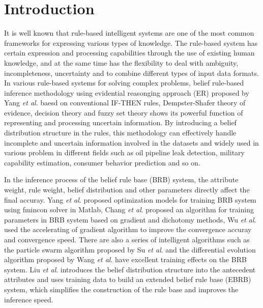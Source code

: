 \documentclass{ieeeaccess}
\begin{document}
\section{Introduction}
\label{sec:introduction}

It is well known that rule-based intelligent systems are one of the most common frameworks for expressing various types of knowledge.
The rule-based system has certain expression and processing capabilities through the use of existing human knowledge,
and at the same time has the flexibility to deal with ambiguity, incompleteness, uncertainty and to combine different types of input data formats.
In various rule-based systems for solving complex problems, belief rule-based inference methodology using evidential reasonging approach (ER) proposed by Yang \textit{et al}.\cite{a1}
baesd on conventional IF-THEN rules\cite{a2}, Dempster-Shafer theory of evidence\cite{a3,a4}, decision theory\cite{a5}
and fuzzy set theory\cite{a6} shows its powerful function of representing and processing uncertain information.
By introducing a belief distribution structure in the rules, this methodology can
effectively handle incomplete and uncertain information involved in the datasets and widely used in various problem in
different fields such as oil pipeline leak detection\cite{a7}, military capability estimation\cite{a8}, consumer behavior
prediction\cite{a9} and so on.

In the inference process of the belief rule base (BRB) system, the attribute weight, rule weight, belief distribution and other parameters
directly affect the final accuray. Yang \textit{et al}.\cite{a10} proposed optimization models for training BRB system using fmincon solver in
Matlab, Chang \textit{et al}.\cite{a11,a12} proposed an algorithm for training parameters in BRB system based on gradient and dichotomy methods,
Wu \textit{et al}.\cite{a13} used the accelerating of gradient algorithm to improve the convergence accuray and convergence speed. There are also
a series of intelligent algorithms such as the particle swarm algorithm proposed by Su \textit{et al}.\cite{a14} and the differential evolution
algorithm proposed by Wang \textit{et al}.\cite{a15} have excellent training effects on the BRB system. Liu \textit{et al}.\cite{a16} introduces the belief distribution
structure into the antecedent attributes and uses training data to build an extended belief rule base (EBRB) system, which simplifies the construction of
the rule base and improves the inference speed.
\end{document}
